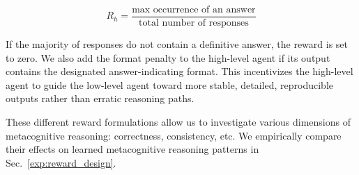 \begin{equation}
    R_h = \frac{\text{max occurrence of an answer}}{\text{total number of responses}}
\end{equation}

If the majority of responses do not contain a definitive answer, the reward is set to zero. 
We also add the format penalty to the high-level agent if its output contains the designated answer-indicating format.
This incentivizes the high-level agent to guide the low-level agent toward more stable, detailed, reproducible outputs rather than erratic reasoning paths.


These different reward formulations allow us to investigate various dimensions of metacognitive reasoning: correctness, consistency, etc. We empirically compare their effects on learned metacognitive reasoning patterns in Sec.~\ref{exp:reward_design}. 


